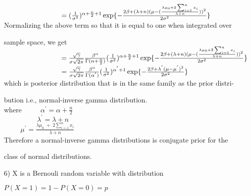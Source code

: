 \documentclass[]{article}
\begin{document}
$\hspace{2.9cm} = (\frac{1}{\sigma^{2}})^{\alpha + \frac{n}{2} + 1} \exp\{-\frac{2\beta + (\lambda + n)(\mu - (\frac{\lambda\mu_{0} + 2\sum_{i=1}^{n} x_i }{\lambda + n}))^{2}}{2\sigma^{2}}\}$\\

Normalizing the above term so that it is equal to one when integrated over

sample space, we get\\

$\hspace{2.9cm} = \frac{\sqrt{\gamma}}{\sigma\sqrt{2\pi}} \frac{\beta^{\alpha}}{\Gamma(\alpha + \frac{n}{2})} (\frac{1}{\sigma^{2}})^{\alpha + \frac{n}{2} + 1}  \exp\{-\frac{2\beta + (\lambda + n)(\mu - (\frac{\lambda\mu_{0} + 2\sum_{i=1}^{n} x_i }{\lambda + n}))^{2}}{2\sigma^{2}}\}$\\

$\hspace{2.9cm} = \frac{\sqrt{\gamma}}{\sigma\sqrt{2\pi}} \frac{\beta^{\alpha}}{\Gamma(\alpha^{'})} (\frac{1}{\sigma^{2}})^{\alpha^{'} + 1}  \exp\{-\frac{2\beta + \lambda^{'}(\mu - \mu^{'})^{2}}{2\sigma^{2}}\}$\\

which is posterior distribution that is in the same family as the prior distri-

bution i.e., normal-inverse gamma distribution.\\

where $\hspace{1cm}\alpha^{'} = \alpha + \frac{n}{2}$\\

$\hspace{2cm} \lambda^{'} = \lambda + n$\\

$\hspace{1cm} \mu^{'} = \frac{\lambda\mu_{0}\; +\; 2\sum_{i=1}^{n} x_i }{\lambda + n}$\\

Therefore a normal-inverse gamma distributions is conjugate prior for the 

class of normal distributions.

\begin{flushleft}
6) X is a Bernouli random variable with distribution
\end{flushleft}

\begin{center}
$P(X=1)= 1-P(X=0)= p$
\end{center}
\end{document}
